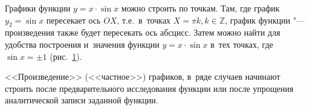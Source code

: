 \begin{figure}\label{fig_1_7_16}
\end{figure}

Графики функции $y = x \cdot \sin x$ можно строить по точкам.
Там, где график $y_{2} = \sin x$ пересекает ось $OX$,
т.е.\ в~точках $X = \pi k, k \in \mathbb{Z}$, график функции
"--- произведения также будет пересекать ось абсцисс.
Затем можно найти для удобства построения и~значения функции
$y = x \cdot \sin x$ в~тех точках, где $\sin x = \pm 1$ (рис.\ \ref{fig_1_7_16}).

<<Произведение>> (<<частное>>) графиков, в~ряде случаев начинают строить
после предварительного исследования функции или после упрощения
аналитической записи заданной функции.

